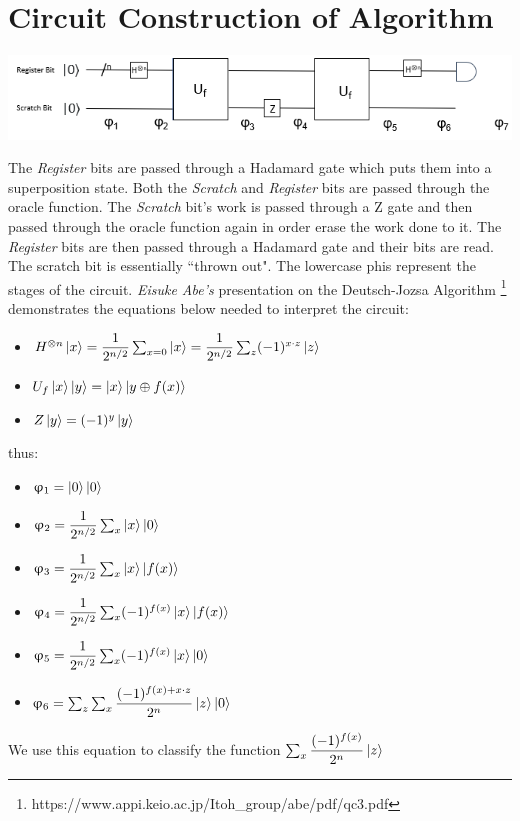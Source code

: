 \documentclass[12pt]{article}
\theoremstyle{definition}
\begin{document}
\section{Circuit Construction of Algorithm}
\begin{center}
\includegraphics[]{circuit.PNG}
\end{center}
The \textit{Register} bits are passed through a Hadamard gate which puts them into a superposition state. Both the \textit{Scratch} and \textit{Register} bits are passed through the oracle function. The \textit{Scratch} bit's work is passed through a Z gate and then passed through the oracle function again in order erase the work done to it. The \textit{Register} bits are then passed through a Hadamard gate and their bits are read. The scratch bit is essentially ``thrown out". The lowercase phis represent the stages of the circuit. \emph{Eisuke Abe's} presentation on the Deutsch-Jozsa Algorithm \footnote{https://www.appi.keio.ac.jp/Itoh_group/abe/pdf/qc3.pdf} demonstrates the equations below needed to interpret the circuit:
\begin{itemize}
\item $H^{\otimes n}\ket{x} = \dfrac{1}{2^{n/2}}\sum_{x = 0}\ket{x}= \dfrac{1}{2^{n/2}}\sum_{z}(-1)^{x\cdot z}\ket{z}$
\item $U_f\ket{x}\ket{y}=\ket{x}\ket{y\oplus f(x)}$
\item $Z\ket{y} = (-1)^y\ket{y}$
\end{itemize}
thus:
\begin{itemize}
\item $\upvarphi_1 = \ket{0}\ket{0}$ 
\item $\upvarphi_2 = \dfrac{1}{2^{n/2}}\sum_{x}\ket{x}\ket{0}$ 
\item $\upvarphi_3 = \dfrac{1}{2^{n/2}}\sum_{x}\ket{x}\ket{f(x)}$ 
\item $\upvarphi_4 = \dfrac{1}{2^{n/2}}\sum_{x}(-1)^{f(x)}\ket{x}\ket{f(x)}$
\item $\upvarphi_5 = \dfrac{1}{2^{n/2}}\sum_{x}(-1)^{f(x)}\ket{x}\ket{0} $
\item $\upvarphi_6 = \sum_z\sum_x\dfrac{(-1)^{f(x)+x\cdot z}}{2^n}\ket{z}\ket{0}$
\end{itemize}
We use this equation to classify the function 
$\sum_x\dfrac{(-1)^{f(x)}}{2^n}\ket{z}$
\end{document}
